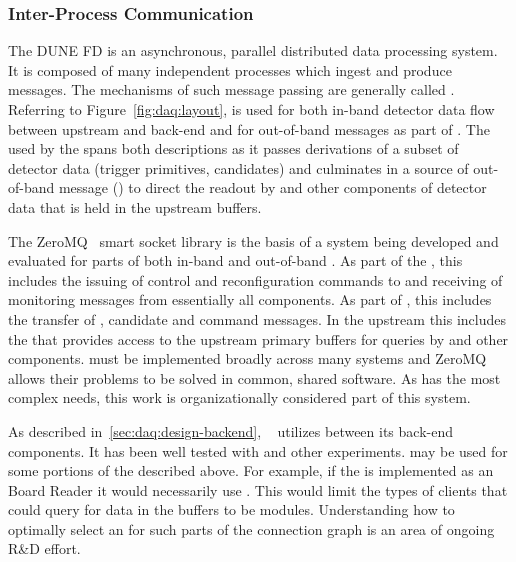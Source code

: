 \subsubsection{Inter-Process Communication}
\label{sec:daq:design-ipc}

The DUNE FD  is an asynchronous, parallel distributed data processing system. 
It is composed of many independent processes which ingest and produce messages. 
The mechanisms of such message passing are generally called . 
Referring to Figure~\ref{fig:daq:layout},  is used for both in-band detector data flow between upstream  and back-end  and for out-of-band messages as part of .  The  used by the  spans both descriptions as it passes derivations of a subset of detector data (trigger primitives, candidates) and culminates in a source of out-of-band message () to direct the readout by  and other components of detector data that is held in the upstream  buffers.

The ZeroMQ~\cite{zeromq} smart socket library is 
the basis of a system being developed and evaluated for parts of both in-band and out-of-band . 
As part of the , this includes the issuing of control and reconfiguration commands to and receiving of monitoring messages from essentially all  components. 
As part of , this includes the transfer of , candidate and command messages. 
In the upstream  this includes the  that  provides access to the upstream  primary buffers for queries by  and other components. 
  must be implemented broadly across many  systems and ZeroMQ allows their problems to be solved in common, shared software.  As  has the most complex   needs, this work is organizationally considered part of this system.

As described in~\ref{sec:daq:design-backend}, ~\cite{artdaq} utilizes   between its back-end components. 
It has been well tested with  and other experiments. 
 may be used for some portions of the   described above. 
For example, if the  is implemented as an  Board Reader it would necessarily use   . 
This would limit the types of clients that could query for data in the buffers to be  modules. 
Understanding how to optimally select an   for such parts of the  connection graph is an area of ongoing R\&D effort.

